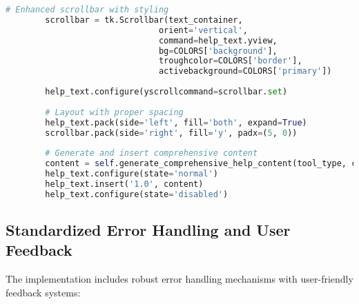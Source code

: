 \documentclass[binding=0.6cm]{sapthesis}
\begin{document}
\begin{lstlisting}[language=Python, caption=Multi-Modal Help System Architecture]
        # Enhanced scrollbar with styling
        scrollbar = tk.Scrollbar(text_container,
                               orient='vertical',
                               command=help_text.yview,
                               bg=COLORS['background'],
                               troughcolor=COLORS['border'],
                               activebackground=COLORS['primary'])
        
        help_text.configure(yscrollcommand=scrollbar.set)
        
        # Layout with proper spacing
        help_text.pack(side='left', fill='both', expand=True)
        scrollbar.pack(side='right', fill='y', padx=(5, 0))
        
        # Generate and insert comprehensive content
        content = self.generate_comprehensive_help_content(tool_type, context)
        help_text.configure(state='normal')
        help_text.insert('1.0', content)
        help_text.configure(state='disabled')
\end{lstlisting}

\subsection{Standardized Error Handling and User Feedback}

The implementation includes robust error handling mechanisms with user-friendly feedback systems:
\end{document}
